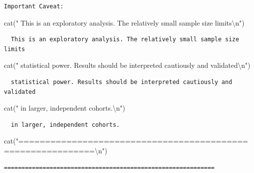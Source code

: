\documentclass[
  letterpaper,
  DIV=11,
  numbers=noendperiod]{scrartcl}
\newenvironment{Shaded}{\begin{snugshade}}{\end{snugshade}}
\newcommand{\FunctionTok}[1]{\textcolor[rgb]{0.28,0.35,0.67}{#1}}
\newcommand{\NormalTok}[1]{\textcolor[rgb]{0.00,0.23,0.31}{#1}}
\newcommand{\SpecialCharTok}[1]{\textcolor[rgb]{0.37,0.37,0.37}{#1}}
\newcommand{\StringTok}[1]{\textcolor[rgb]{0.13,0.47,0.30}{#1}}
\begin{document}
\begin{verbatim}
Important Caveat:
\end{verbatim}

\begin{Shaded}
\begin{Highlighting}[]
\FunctionTok{cat}\NormalTok{(}\StringTok{"  This is an exploratory analysis. The relatively small sample size limits}\SpecialCharTok{\textbackslash{}n}\StringTok{"}\NormalTok{)}
\end{Highlighting}
\end{Shaded}

\begin{verbatim}
  This is an exploratory analysis. The relatively small sample size limits
\end{verbatim}

\begin{Shaded}
\begin{Highlighting}[]
\FunctionTok{cat}\NormalTok{(}\StringTok{"  statistical power. Results should be interpreted cautiously and validated}\SpecialCharTok{\textbackslash{}n}\StringTok{"}\NormalTok{)}
\end{Highlighting}
\end{Shaded}

\begin{verbatim}
  statistical power. Results should be interpreted cautiously and validated
\end{verbatim}

\begin{Shaded}
\begin{Highlighting}[]
\FunctionTok{cat}\NormalTok{(}\StringTok{"  in larger, independent cohorts.}\SpecialCharTok{\textbackslash{}n}\StringTok{"}\NormalTok{)}
\end{Highlighting}
\end{Shaded}

\begin{verbatim}
  in larger, independent cohorts.
\end{verbatim}

\begin{Shaded}
\begin{Highlighting}[]
\FunctionTok{cat}\NormalTok{(}\StringTok{"============================================================}\SpecialCharTok{\textbackslash{}n}\StringTok{"}\NormalTok{)}
\end{Highlighting}
\end{Shaded}

\begin{verbatim}
============================================================
\end{verbatim}
\end{document}
